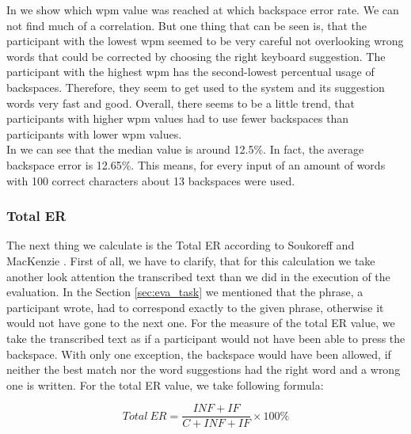 In  we show which wpm value was reached at which backspace error rate. We can not find much of a correlation. But one thing that can be seen is, that the participant with the lowest wpm seemed to be very careful not overlooking wrong words that could be corrected by choosing the right keyboard suggestion. The participant with the highest wpm has the second-lowest percentual usage of backspaces. Therefore, they seem to get used to the system and its suggestion words very fast and good. Overall, there seems to be a little trend, that participants with higher wpm values had to use fewer backspaces than participants with lower wpm values.\\
In  we can see that the median value is around 12.5\%. In fact, the average backspace error is 12.65\%. This means, for every input of an amount of words with 100 correct characters about 13 backspaces were used.\\

\subsubsection{Total ER}
\label{sec:total_er}
The next thing we calculate is the Total ER according to Soukoreff and MacKenzie \cite{10.1145/642611.642632}. First of all, we have to clarify, that for this calculation we take another look attention the transcribed text than we did in the execution of the evaluation. In the Section \ref{sec:eva_task} we mentioned that the phrase, a participant wrote, had to correspond exactly to the given phrase, otherwise it would not have gone to the next one. For the measure of the total ER value, we take the transcribed text as if a participant would not have been able to press the backspace. With only one exception, the backspace would have been allowed, if neither the best match nor the word suggestions had the right word and a wrong one is written. For the total ER value, we take following formula:

\begin{equation}
    Total\ ER = \frac{INF + IF}{C + INF + IF} \times 100\%
\end{equation}

